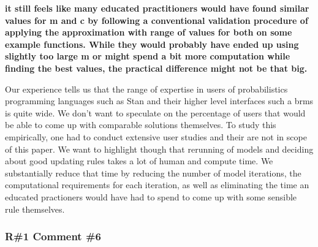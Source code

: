 \documentclass[11pt]{report}
\begin{document}
\textbf{it still feels like many educated practitioners would have found similar values for m and c by following a conventional validation procedure of applying the approximation with range of values for both on some example functions. While they would probably have ended up using slightly too large m or might spend a bit more computation while finding the best values, the practical difference might not be that big.}

Our experience tells us that the range of expertise in users of probabilistics programming languages such as Stan and their higher level interfaces such a brms is quite wide. We don't want to speculate on the percentage of users that would be able to come up with comparable solutions themselves. To study this empirically, one had to conduct extensive user studies and their are not in scope of this paper.
We want to highlight though that rerunning of models and deciding about good updating rules takes a lot of human and compute time. We substantially reduce that time by reducing the number of model iterations, the computational requirements for each iteration, as well as eliminating the time an educated practioners would have had to spend to come up with some sensible rule themselves.




\subsubsection*{R\#1 Comment \#6}
\end{document}
